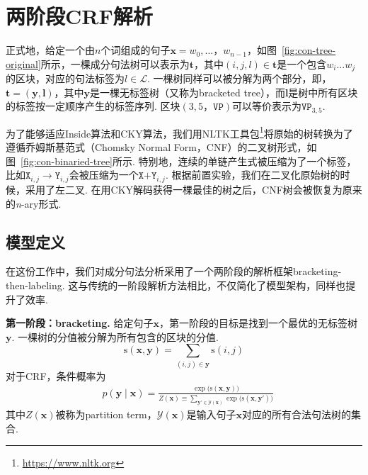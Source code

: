 \section{两阶段CRF解析}\label{sec:2stage-parsing}

正式地，给定一个由$n$个词组成的句子$\boldsymbol{x}=w_0,\dots，w_{n-1}$，如图~\ref{fig:con-tree-original}所示，一棵成分句法树可以表示为$\boldsymbol{t}$，其中$(i,j,l) \in \boldsymbol{t}$是一个包含$w_{i}...w_{j}$的区块，对应的句法标签为$l \in \mathcal{L}$.
一棵树同样可以被分解为两个部分，即，$\boldsymbol{t}=(\boldsymbol{y}, \boldsymbol{l})$，其中$\boldsymbol{y}$是一棵无标签树（又称为bracketed tree），而$\boldsymbol{l}$是树中所有区块的标签按一定顺序产生的标签序列.
区块$(3,5，\texttt{VP})$可以等价表示为$\texttt{VP}_{3,5}$.

为了能够适应Inside算法和CKY算法，我们用NLTK工具包\footnote{\url{https://www.nltk.org}}将原始的树转换为了遵循乔姆斯基范式（Chomsky Normal Form，CNF）的二叉树形式，如图~\ref{fig:con-binaried-tree}所示.
特别地，连续的单链产生式被压缩为了一个标签，比如$\texttt{X}_{i,j} \rightarrow \texttt{Y}_{i,j}$会被压缩为一个$\texttt{X+Y}_{i,j}$.
根据前置实验，我们在二叉化原始树的时候，采用了左二叉.
在用CKY解码获得一棵最佳的树之后，CNF树会被恢复为原来的\textit{n}-ary形式.

\subsection{模型定义}\label{sub@sec:model-definition}

在这份工作中，我们对成分句法分析采用了一个两阶段的解析框架bracketing-then-labeling.
这与传统的一阶段解析方法\cite{stern-etal-2017-minimal,gaddy-etal-2018-whats}相比，不仅简化了模型架构，同样也提升了效率.

\noindent\textbf{第一阶段：bracketing.}
给定句子$\boldsymbol{x}$，第一阶段的目标是找到一个最优的无标签树$\boldsymbol{y}$.
一棵树的分值被分解为所有包含的区块的分值.
\begin{equation} \label{eq:tree-score}
    \mathrm{s}(\boldsymbol{x},\boldsymbol{y}) = \sum\limits_{(i,j)\in \boldsymbol{y}}\mathrm{s}(i,j)
\end{equation}
对于CRF，条件概率为
\begin{equation}\label{eq:tree-prob}
    \begin{split}
        & p(\boldsymbol{y}\mid\boldsymbol{x})  = \frac{\exp({\mathrm{s}(\boldsymbol{x},\boldsymbol{y}))}}{Z(\boldsymbol{x}) \equiv \sum\limits_{\boldsymbol{y'} \in \mathcal{Y}(\boldsymbol{x})} {\exp({\mathrm{s}(\boldsymbol{x},\boldsymbol{y'}))}}}
    \end{split}
\end{equation}
其中$Z(\boldsymbol{x})$被称为partition term，$\mathcal{Y}(\boldsymbol{x})$是输入句子$\boldsymbol{x}$对应的所有合法句法树的集合.

